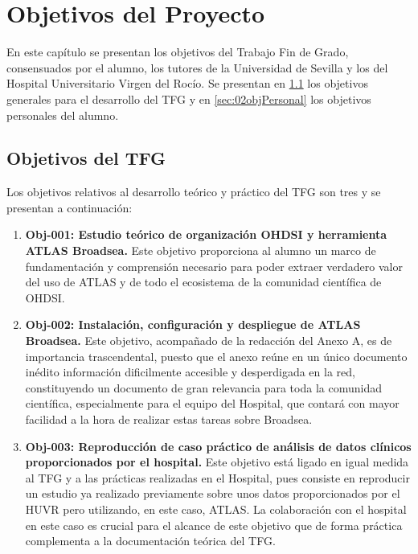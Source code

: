 \chapter{Objetivos del Proyecto}\label{cap:02objetivos}

En este capítulo se presentan los objetivos del Trabajo Fin de Grado, consensuados por el alumno, los tutores de la Universidad de Sevilla y los del Hospital Universitario Virgen del Rocío. Se presentan en \ref{sec:02objTFG} los objetivos generales para el desarrollo del TFG y en \ref{sec:02objPersonal} los objetivos personales del alumno.

\section{Objetivos del TFG} \label{sec:02objTFG}

Los objetivos relativos al desarrollo teórico y práctico del TFG son tres y se presentan a continuación:

%

\begin{enumerate}

    \item \textbf{Obj-001: Estudio teórico de organización OHDSI y herramienta ATLAS Broadsea.} Este objetivo proporciona al alumno un marco de fundamentación y comprensión necesario para poder extraer verdadero valor del uso de ATLAS y de todo el ecosistema de la comunidad científica de OHDSI.

    \item \textbf{Obj-002: Instalación, configuración y despliegue de ATLAS Broadsea.} Este objetivo, acompañado de la redacción del Anexo A, es de importancia trascendental, puesto que el anexo reúne en un único documento inédito información dificilmente accesible y desperdigada en la red, constituyendo un documento de gran relevancia para toda la comunidad científica, especialmente para el equipo del Hospital, que contará con mayor facilidad a la hora de realizar estas tareas sobre Broadsea.

    \item \textbf{Obj-003: Reproducción de caso práctico de análisis de datos clínicos proporcionados por el hospital.} Este objetivo está ligado en igual medida al TFG y a las prácticas realizadas en el Hospital, pues consiste en reproducir un estudio ya realizado previamente sobre unos datos proporcionados por el HUVR pero utilizando, en este caso, ATLAS. La colaboración con el hospital en este caso es crucial para el alcance de este objetivo que de forma práctica complementa a la documentación teórica del TFG.

\end{enumerate}

